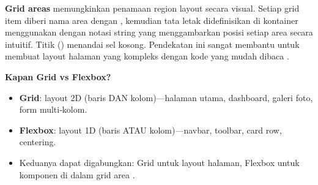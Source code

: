 \textbf{Grid areas} memungkinkan penamaan region layout secara visual. Setiap grid item diberi nama area dengan , kemudian tata letak didefinisikan di kontainer menggunakan  dengan notasi string yang menggambarkan posisi setiap area secara intuitif. Titik () menandai sel kosong. Pendekatan ini sangat membantu untuk membuat layout halaman yang kompleks dengan kode yang mudah dibaca \cite{cssTricks}.

\begin{konsep}
\textbf{Kapan Grid vs Flexbox?}
\begin{itemize}
  \item \textbf{Grid}: layout 2D (baris DAN kolom)---halaman utama, dashboard, galeri foto, form multi-kolom.
  \item \textbf{Flexbox}: layout 1D (baris ATAU kolom)---navbar, toolbar, card row, centering.
  \item Keduanya dapat digabungkan: Grid untuk layout halaman, Flexbox untuk komponen di dalam grid area \cite{cssTricks}.
\end{itemize}
\end{konsep}


